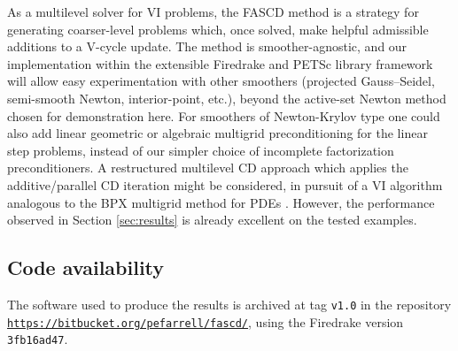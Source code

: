 \documentclass[review,hidelinks,onefignum,onetabnum]{siamart220329}
\begin{document}
As a multilevel solver for VI problems, the FASCD method is a strategy for generating coarser-level problems which, once solved, make helpful admissible additions to a V-cycle update.  The method is smoother-agnostic, and our implementation within the extensible Firedrake \cite{Rathgeberetal2016} and PETSc \cite{Balayetal2023} library framework will allow easy experimentation with other smoothers (projected Gauss--Seidel, semi-smooth Newton, interior-point, etc.), beyond the active-set Newton method chosen for demonstration here.  For smoothers of Newton-Krylov type one could also add linear geometric or algebraic multigrid preconditioning \cite{Trottenbergetal2001} for the linear step problems, instead of our simpler choice of incomplete factorization preconditioners.  A restructured multilevel CD approach which applies the additive/parallel CD iteration \cite{Tai2003} might be considered, in pursuit of a VI algorithm analogous to the BPX multigrid method for PDEs \cite{BramblePasciakXu1990}.  However, the performance observed in Section \ref{sec:results} is already excellent on the tested examples.


\subsection*{Code availability} \label{sec:code}  The software used to produce the results is archived at tag \texttt{v1.0} in the repository \texttt{\url{https://bitbucket.org/pefarrell/fascd/}}, using the Firedrake version \texttt{3fb16ad47}.




\end{document}
